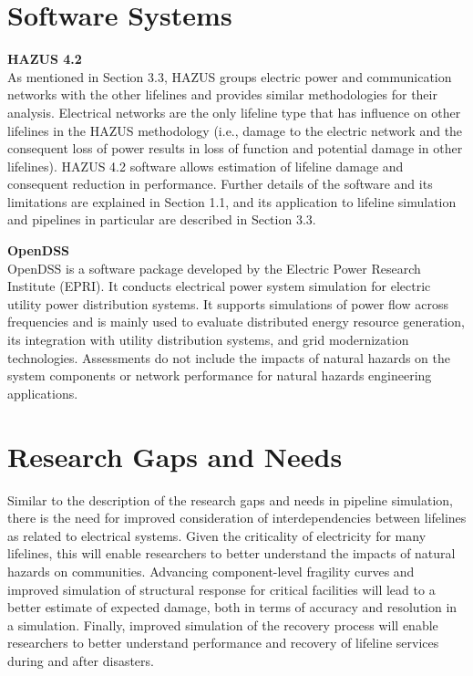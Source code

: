 \section{Software Systems}
\label{sec:perf_power_tools}

\noindent\textbf{HAZUS 4.2} \\As mentioned in Section 3.3, HAZUS groups electric power and communication networks with the other lifelines and provides similar methodologies for their analysis. Electrical networks are the only lifeline type that has influence on other lifelines in the HAZUS methodology (i.e., damage to the electric network and the consequent loss of power results in loss of function and potential damage in other lifelines). HAZUS 4.2 software allows estimation of lifeline damage and consequent reduction in performance. Further details of the software and its limitations are explained in Section 1.1, and its application to lifeline simulation and pipelines in particular are described in Section 3.3.
\newline

\noindent\textbf{OpenDSS} \\OpenDSS is a software package developed by the Electric Power Research Institute (EPRI). It conducts electrical power system simulation for electric utility power distribution systems. It supports simulations of power flow across frequencies and is mainly used to evaluate distributed energy resource generation, its integration with utility distribution systems, and grid modernization technologies. Assessments do not include the impacts of natural hazards on the system components or network performance for natural hazards engineering applications.

\section{Research Gaps and Needs}
\label{sec:perf_power_gaps}

Similar to the description of the research gaps and needs in pipeline simulation, there is the need for improved consideration of interdependencies between lifelines as related to electrical systems. Given the criticality of electricity for many lifelines, this will enable researchers to better understand the impacts of natural hazards on communities. Advancing component-level fragility curves and improved simulation of structural response for critical facilities will lead to a better estimate of expected damage, both in terms of accuracy and resolution in a simulation. Finally, improved simulation of the recovery process will enable researchers to better understand performance and recovery of lifeline services during and after disasters.